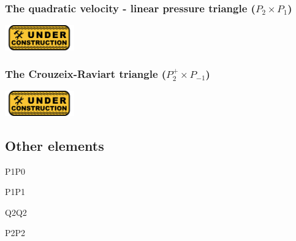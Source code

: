 \subsubsection{The quadratic velocity - linear pressure triangle ($P_2\times P_1$)}
\includegraphics[width=3cm]{images/under_construction}

\subsubsection{The Crouzeix-Raviart triangle ($P_2^+\times P_{-1}$)}
\includegraphics[width=3cm]{images/under_construction}

\subsection{Other elements}

P1P0

P1P1

Q2Q2

P2P2

